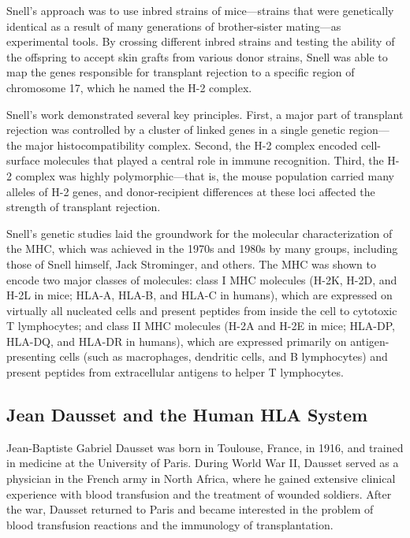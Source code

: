 Snell's approach was to use inbred strains of mice---strains that were genetically identical as a result of many generations of brother-sister mating---as experimental tools. By crossing different inbred strains and testing the ability of the offspring to accept skin grafts from various donor strains, Snell was able to map the genes responsible for transplant rejection to a specific region of chromosome 17, which he named the H-2 complex.

Snell's work demonstrated several key principles. First, a major part of transplant rejection was controlled by a cluster of linked genes in a single genetic region---the major histocompatibility complex. Second, the H-2 complex encoded cell-surface molecules that played a central role in immune recognition. Third, the H-2 complex was highly polymorphic---that is, the mouse population carried many alleles of H-2 genes, and donor-recipient differences at these loci affected the strength of transplant rejection.

Snell's genetic studies laid the groundwork for the molecular characterization of the MHC, which was achieved in the 1970s and 1980s by many groups, including those of Snell himself, Jack Strominger, and others. The MHC was shown to encode two major classes of molecules: class I MHC molecules (H-2K, H-2D, and H-2L in mice; HLA-A, HLA-B, and HLA-C in humans), which are expressed on virtually all nucleated cells and present peptides from inside the cell to cytotoxic T lymphocytes; and class II MHC molecules (H-2A and H-2E in mice; HLA-DP, HLA-DQ, and HLA-DR in humans), which are expressed primarily on antigen-presenting cells (such as macrophages, dendritic cells, and B lymphocytes) and present peptides from extracellular antigens to helper T lymphocytes.

\subsection{Jean Dausset and the Human HLA System}

Jean-Baptiste Gabriel Dausset was born in Toulouse, France, in 1916, and trained in medicine at the University of Paris. During World War II, Dausset served as a physician in the French army in North Africa, where he gained extensive clinical experience with blood transfusion and the treatment of wounded soldiers. After the war, Dausset returned to Paris and became interested in the problem of blood transfusion reactions and the immunology of transplantation.

